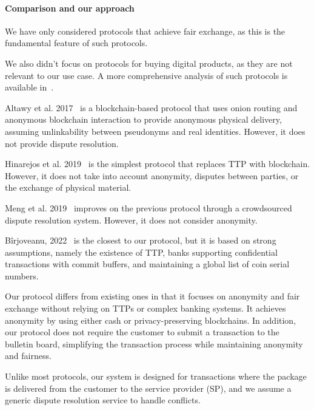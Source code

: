 \documentclass[pdftex,twocolumn,epjc3]{svjour3}
\begin{document}
\paragraph{Comparison and our approach}

We have only considered protocols that achieve fair exchange, as this is the fundamental feature of such protocols.

\begin{sloppypar}
We also didn't focus on protocols for buying digital products, as they are not relevant to our use case. A more comprehensive analysis of such protocols is available in~\cite{birjoveanuTwoPartyECommerceProtocols2022}.
\end{sloppypar}

Altawy et al. 2017~\cite{altawyLelantosBlockchainBasedAnonymous2017} is a blockchain-based protocol that uses onion routing and anonymous blockchain interaction to provide anonymous physical delivery, assuming unlinkability between pseudonyms and real identities. However, it does not provide dispute resolution.

Hinarejos et al. 2019~\cite{hinarejosSolutionSecureCertified2019} is the simplest protocol that replaces TTP with blockchain. However, it does not take into account anonymity, disputes between parties, or the exchange of physical material.

Meng et al. 2019~\cite{mengThemisDecentralizedEscrow2019} improves on the previous protocol through a crowdsourced dispute resolution system. However, it does not consider anonymity.

Bîrjoveanu, 2022~\cite{birjoveanuTwoPartyECommerceProtocols2022} is the closest to our protocol, but it is based on strong assumptions, namely the existence of TTP, banks supporting confidential transactions with commit buffers, and maintaining a global list of coin serial numbers.

Our protocol differs from existing ones in that it focuses on anonymity and fair exchange without relying on TTPs or complex banking systems. It achieves anonymity by using either cash or privacy-preserving blockchains. In addition, our protocol does not require the customer to submit a transaction to the bulletin board, simplifying the transaction process while maintaining anonymity and fairness.

Unlike most protocols, our system is designed for transactions where the package is delivered from the customer to the service provider (SP), and we assume a generic dispute resolution service to handle conflicts.
\end{document}

